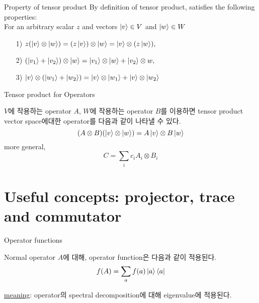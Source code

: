 \documentclass[9pt]{beamer}
\begin{document}
    \begin{frame}{Property of tensor product}
        By definition of tensor product, satisfies the following properties: \\ 
        For an arbitrary scalar $z$ and vectors $\ket v \in V$ and $\ket w \in W$
        \begin{itemize}
            \item[1)] $z(\ket v \otimes \ket w) = (z \ket v) \otimes \ket w = \ket v \otimes (z \ket w),$
            \item[2)] $(\ket{v_1} + \ket{v_2}) \otimes \ket w = \ket{v_1} \otimes \ket w + \ket{v_2} \otimes w,$
            \item[3)] $\ket v \otimes (\ket{w_1} + \ket{w_2}) = \ket v \otimes \ket{w_1} + \ket v \otimes \ket{w_2}$
        \end{itemize}
    \end{frame}

    \begin{frame}{Tensor product for Operators}
        \begin{definition}
            $V$에 작용하는 operator $A$, $W$에 작용하는 operator $B$를 이용하면 tensor product vector space에대한 operator를 다음과 같이 나타낼 수 있다.
            $$(A\otimes B) (\ket v \otimes \ket w) = A\ket v \otimes B \ket w$$
            more general,
            $$C = \sum_i c_i A_i \otimes B_i $$
        \end{definition}

    \end{frame}

    \section{Useful concepts: projector, trace and commutator}
    \begin{frame}{Operator functions}
        \begin{definition}
            Normal operator $A$에 대해, operator function은 다음과 같이 적용된다.
            $$f(A) = \sum_a f(a) \ket a \bra a$$ 
        \end{definition}
        \checkmark \underline{meaning}: operator의 spectral decomposition에 대해 eigenvalue에 적용된다.
    \end{frame}
\end{document}
